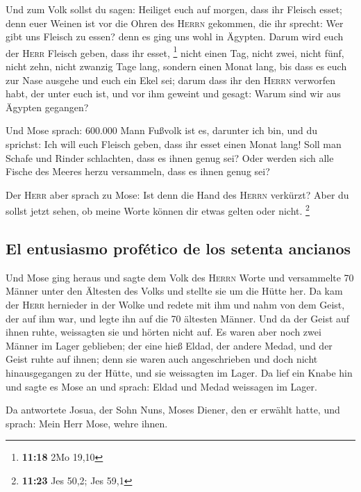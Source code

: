  Und zum Volk sollst du sagen: Heiliget euch auf morgen,
dass ihr Fleisch esset; denn euer Weinen ist vor die Ohren des
\textsc{Herrn} gekommen, die ihr sprecht: Wer gibt uns Fleisch zu essen?
denn es ging uns wohl in Ägypten. Darum wird euch der \textsc{Herr}
Fleisch geben, dass ihr esset, \footnote{\textbf{11:18} 2Mo 19,10}
 nicht einen Tag, nicht zwei, nicht fünf, nicht zehn,
nicht zwanzig Tage lang,  sondern einen Monat lang, bis
dass es euch zur Nase ausgehe und euch ein Ekel sei; darum dass ihr den
\textsc{Herrn} verworfen habt, der unter euch ist, und vor ihm geweint
und gesagt: Warum sind wir aus Ägypten gegangen?

 Und Mose sprach: 600.000 Mann Fußvolk ist es, darunter
ich bin, und du sprichst: Ich will euch Fleisch geben, dass ihr esset
einen Monat lang!  Soll man Schafe und Rinder schlachten,
dass es ihnen genug sei? Oder werden sich alle Fische des Meeres herzu
versammeln, dass es ihnen genug sei?

 Der \textsc{Herr} aber sprach zu Mose: Ist denn die Hand
des \textsc{Herrn} verkürzt? Aber du sollst jetzt sehen, ob meine Worte
können dir etwas gelten oder nicht. \footnote{\textbf{11:23} Jes 50,2;
  Jes 59,1}

\hypertarget{el-entusiasmo-profuxe9tico-de-los-setenta-ancianos}{%
\subsection{El entusiasmo profético de los setenta
ancianos}\label{el-entusiasmo-profuxe9tico-de-los-setenta-ancianos}}

 Und Mose ging heraus und sagte dem Volk des
\textsc{Herrn} Worte und versammelte 70 Männer unter den Ältesten des
Volks und stellte sie um die Hütte her.  Da kam der
\textsc{Herr} hernieder in der Wolke und redete mit ihm und nahm von dem
Geist, der auf ihm war, und legte ihn auf die 70 ältesten Männer. Und da
der Geist auf ihnen ruhte, weissagten sie und hörten nicht auf.
 Es waren aber noch zwei Männer im Lager geblieben; der
eine hieß Eldad, der andere Medad, und der Geist ruhte auf ihnen; denn
sie waren auch angeschrieben und doch nicht hinausgegangen zu der Hütte,
und sie weissagten im Lager.  Da lief ein Knabe hin und
sagte es Mose an und sprach: Eldad und Medad weissagen im Lager.

 Da antwortete Josua, der Sohn Nuns, Moses Diener, den er
erwählt hatte, und sprach: Mein Herr Mose, wehre ihnen.

